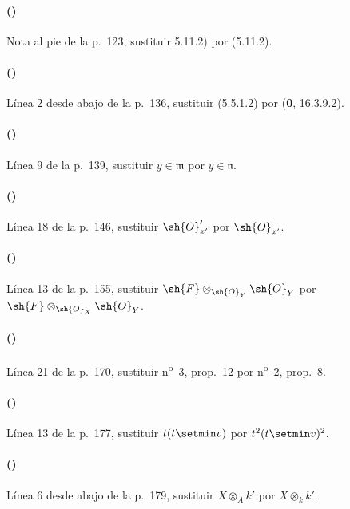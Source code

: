 \paragraph{({\texorpdfstring{\protect{}}{IV, 5.11.2}})}
Nota al pie de la p.~123, sustituir 5.11.2) por (5.11.2).

\paragraph{({\texorpdfstring{\protect{}}{IV, 6.1.5}})}
Línea 2 desde abajo de la p.~136, sustituir (5.5.1.2) por
(\textbf{0}, 16.3.9.2).

\paragraph{({\texorpdfstring{\protect{}}{IV, 6.3.1}})}
Línea 9 de la p.~139, sustituir $y\in\mathfrak m$ por
$y\in\mathfrak n$.

\paragraph{({\texorpdfstring{\protect{}}{IV, 6.7.2}})}
Línea 18 de la p.~146, sustituir $\sh{O}'_{x'}$ por $\sh{O}_{x'}$.

\paragraph{({\texorpdfstring{\protect{}}{IV, 6.10.1}})}
Línea 13 de la p.~155, sustituir
$\sh{F}\otimes_{\sh{O}_Y}\sh{O}_Y$ por
$\sh{F}\otimes_{\sh{O}_X}\sh{O}_Y$.

\paragraph{({\texorpdfstring{\protect{}}{IV, 6.14.1}})}
Línea 21 de la p.~170, sustituir n\textsuperscript{o}~3, prop.~12
por n\textsuperscript{o}~2, prop.~8.

\paragraph{({\texorpdfstring{\protect{}}{IV, 6.15.2}})}
Línea 13 de la p.~177, sustituir $t(t\setmin v)$ por $t^2(t\setmin v)^2$.

\paragraph{({\texorpdfstring{\protect{}}{IV, 6.15.7}})}
Línea 6 desde abajo de la p.~179, sustituir $X\otimes_Ak'$ por
$X\otimes_kk'$.

